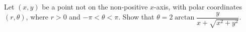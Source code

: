 Let $(x,y)$ be a point not on the non-positive $x$-axis, with polar coordinates $(r,\theta)$, where $r>0$ and $-\pi<\theta<\pi$. Show that $\theta=2\arctan\dfrac{y}{x+\sqrt{x^2+y^2}}$.
